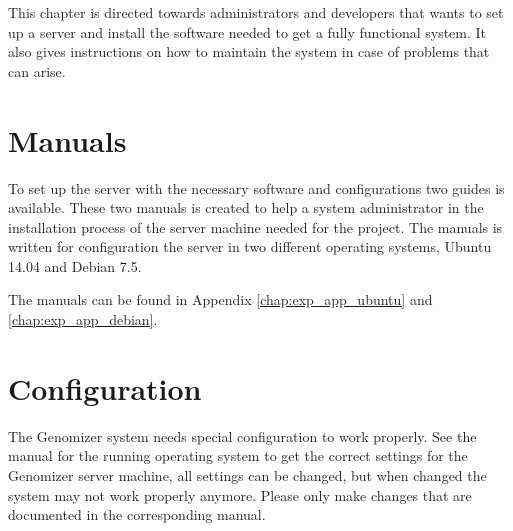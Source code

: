 This chapter is directed towards administrators and developers that wants to
set up a server and install the software needed to get a fully functional system.
It also gives instructions on how to maintain the system in case of problems
that can arise.
\section{Manuals}
To set up the server with the necessary software and configurations two guides is available. These two manuals is created to help a system administrator in the installation process of the server machine needed for the project. The manuals is written for configuration the server in two different operating systems, Ubuntu 14.04 and Debian 7.5. 

The manuals can be found in Appendix \ref{chap:exp_app_ubuntu} and \ref{chap:exp_app_debian}.

\section{Configuration}
The Genomizer system needs special configuration to work properly. See the manual for the running operating system to get the correct settings for the Genomizer server machine, all settings can be changed, but when changed the system may not work properly anymore. Please only make changes that are documented in the corresponding manual.